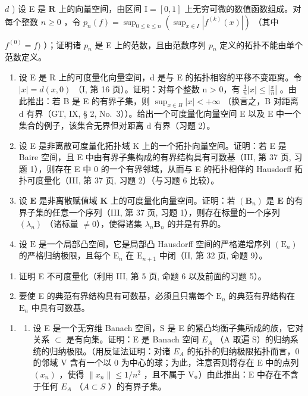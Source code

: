 \(d\) ) 设 E 是 \(\mathbf{R}\) 上的向量空间，由区间 \(\mathrm{I} = [0,1]\) 上无穷可微的数值函数组成。对每个整数 \(n\geqslant 0\) ，令 \(p_n(f) = \sup_{0\leqslant k\leqslant n}\left(\sup_{x\in I}|f^{(k)}(x)|\right)\) （其中

\(f^{(0)} = f)\) ）；证明诸 \(p_n\) 是 E 上的范数，且由范数序列 \(p_n\) 定义的拓扑不能由单个范数定义。

\begin{enumerate}
\def\labelenumi{\arabic{enumi})}
\setcounter{enumi}{2}
\item
  设 E 是 R 上的可度量化向量空间，d 是与 E 的拓扑相容的平移不变距离。令 \(|x| = d(x, 0)\) （I, 第 16 页）。证明：对每个整数 n \textgreater{} 0，有 \(\frac{1}{n}|x| \leqslant \left|\frac{x}{n}\right|\) 。由此推出：若 B 是 E 的有界子集，则 \(\sup_{x \in B} |x| < +\infty\) （换言之，B 对距离 d 有界（GT, IX, § 2, No.~3））。给出一个可度量化向量空间 E 以及 E 中一个集合的例子，该集合无界但对距离 d 有界（习题 2）。
\item
  设 E 是非离散可度量化拓扑域 K 上的一个拓扑向量空间。证明：若 E 是 Baire 空间，且 E 中由有界子集构成的有界结构具有可数基（III, 第 37 页, 习题 1），则存在 E 中 0 的一个有界邻域，从而与 E 的拓扑相伴的 Hausdorff 拓扑可度量化（III, 第 37 页, 习题 2）（与习题 6 比较）。
\item
  设 \(\mathbf{E}\) 是非离散赋值域 \(\mathbf{K}\) 上的可度量化向量空间。证明：若 \((\mathbf{B}_n)\) 是 \(\mathbf{E}\) 的有界子集的任意一个序列（III, 第 37 页, 习题 1），则存在标量的一个序列 \((\lambda_n)\) （诸标量 \(\neq 0\)），使得诸集 \(\lambda_n\mathbf{B}_n\) 的并是有界的。
\item
  设 \(\mathrm{E}\) 是一个局部凸空间，它是局部凸 Hausdorff 空间的严格递增序列 \((\mathrm{E}_n)\) 的严格归纳极限，且每个 \(\mathrm{E}_n\) 在 \(\mathrm{E}_{n+1}\) 中闭（II, 第 32 页, 命题 9）。
\end{enumerate}

\begin{enumerate}
\def\labelenumi{\alph{enumi})}
\tightlist
\item
  证明 E 不可度量化（利用 III, 第 5 页, 命题 6 以及前面的习题 5）。\\
\item
  要使 E 的典范有界结构具有可数基，必须且只需每个 \(\mathrm{E}_n\) 的典范有界结构在 \(\mathrm{E}_n\) 中具有可数基。
\end{enumerate}

\begin{enumerate}
\def\labelenumi{\arabic{enumi})}
\setcounter{enumi}{6}
\tightlist
\item
  \begin{enumerate}
  \def\labelenumii{\alph{enumii})}
  \tightlist
  \item
    设 E 是一个无穷维 Banach 空间，S 是 E 的紧凸均衡子集所成的族，它对关系 \(\subset\) 是有向集。证明：E 是 Banach 空间 \(E_{A}\) （A 取遍 S）的归纳系统的归纳极限。（用反证法证明：对诸 \(E_{A}\) 的拓扑的归纳极限拓扑而言，0 的邻域 V 含有一个以 0 为中心的球；为此，注意否则将存在 E 中的点列 \((x_{n})\) ，使得 \(\|x_{n}\| \leqslant 1/n^{2}\) ，且不属于 V。）由此推出：E 中存在不含于任何 \(E_{A}\) （\(A \subset S\) ）的有界子集。
  \end{enumerate}
\end{enumerate}

